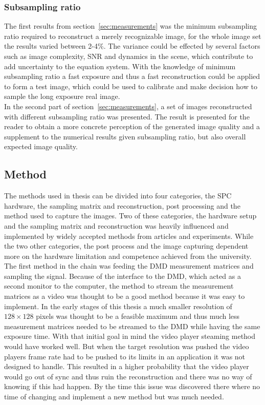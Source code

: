 \subsubsection{Subsampling ratio}
The first results from section~\ref{sec:measurements} was the minimum subsampling ratio required to reconstruct a merely recognizable image, for the whole image set the results varied between 2-4\%. The variance could be effected by several factors such as image complexity, SNR and dynamics in the scene, which contribute to add uncertainty to the equation system. With the knowledge of minimum subsampling ratio a fast exposure and thus a fast reconstruction could be applied to form a test image, which could be used to calibrate and make decision how to sample the long exposure real image.\\[0.1in]

In the second part of section~\ref{sec:measurements}, a set of images reconstructed with different subsampling ratio was presented. The result is presented for the reader to obtain a more concrete perception of the generated image quality and a supplement to the numerical results given subsampling ratio, but also overall expected image quality.

\subsection{Method} %

The methods used in thesis can be divided into four categories, the SPC hardware, the sampling matrix and reconstruction, post processing and the method used to capture the images. Two of these categories, the hardware setup and the sampling matrix and reconstruction was heavily influenced and implemented by widely accepted methods from articles and experiments. While the two other categories, the post process and the image capturing dependent more on the hardware limitation and competence achieved from the university.\\[0.1in]

The first method in the chain was feeding the DMD measurement matrices and sampling the signal. Because of the interface to the DMD, which acted as a second monitor to the computer, the method to stream the measurement matrices as a video was thought to be a good method because it was easy to implement. In the early stages of this thesis a much smaller resolution of $128 \times 128$ pixels was thought to be a feasible maximum and thus much less measurement matrices needed to be streamed to the DMD while having the same exposure time. With that initial goal in mind the video player steaming method would have worked well. But when the target resolution was pushed the video players frame rate had to be pushed to its limits in an application it was not designed to handle. This resulted in a higher probability that the video player would go out of sync and thus ruin the reconstruction and there was no way of knowing if this had happen. By the time this issue was discovered there where no time of changing and implement a new method but was much needed.\\[0.1in]

